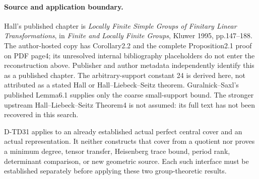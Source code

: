 \paragraph{Source and application boundary.}
Hall's published chapter is \emph{Locally Finite Simple Groups of
Finitary Linear Transformations}, in \emph{Finite and Locally Finite
Groups}, Kluwer 1995, pp.147--188. The author-hosted copy has
Corollary2.2 and the complete Proposition2.1 proof on PDF page4;
its unresolved internal bibliography placeholders do not enter
the reconstruction above. Publisher and author metadata independently
identify this as a published chapter. The arbitrary-support constant
24 is derived here, not attributed as a stated Hall or
Hall--Liebeck--Seitz theorem. Guralnick--Saxl's published Lemma6.1
supplies only the coarse small-support bound. The stronger upstream
Hall--Liebeck--Seitz Theorem4 is not assumed: its full text has
not been recovered in this search.

D-TD31 applies to an already established actual perfect central
cover and an actual representation. It neither constructs that
cover from a quotient nor proves a minimum degree, tensor transfer,
Heisenberg trace bound, period rank, determinant comparison, or
new geometric source. Each such interface must be established
separately before applying these two group-theoretic results.

